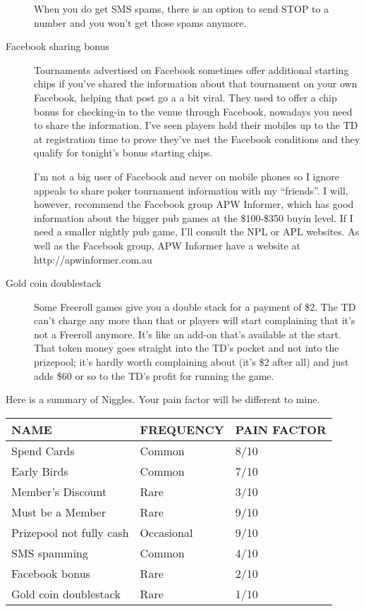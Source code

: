 \begin{description}
When you do get SMS spams, there is an option to send STOP to a number
and you won't get those spams anymore.

\item[Facebook sharing bonus] Tournaments advertised on Facebook sometimes
offer additional starting chips if you've shared the information
about that tournament on your own Facebook, helping that post go a
a bit viral. They used to offer a chip bonus for
checking-in to the venue through Facebook, nowadays you need to share
the information. I've seen players hold their mobiles up to the TD at
registration time to prove they've met the Facebook conditions and
they qualify for tonight's bonus starting chips.

I'm not a big user of Facebook and never on mobile phones so I ignore
appeals to share poker tournament information with my ``friends''. I
will, however, recommend the Facebook group APW Informer, which has
good information about the bigger pub games at the \$100-\$350 buyin
level. If I need a smaller nightly pub game, I'll consult the NPL or
APL websites. As well as the Facebook group, APW Informer have a
website at http://apwinformer.com.au

\item[Gold coin doublestack] Some Freeroll games give you a double stack
for a payment of \$2. The TD can't charge any more than that or
players will start complaining that it's not a Freeroll anymore.
It's like an add-on that's available at the start. That token
money goes straight into the TD's pocket and not into the prizepool;
it's hardly worth complaining about (it's \$2 after all) and just adds
\$60 or so to the TD's profit for running the game.

\end{description}

Here is a summary of Niggles. Your pain factor will be different to
mine.

\begin{tabular}{|l|l|l|} \hline
NAME    &  FREQUENCY  & PAIN FACTOR\\ \hline
Spend Cards & Common  & 8/10\\ \hline
Early Birds & Common & 7/10\\ \hline
Member's Discount & Rare  & 3/10\\ \hline
Must be a Member & Rare  & 9/10\\ \hline
Prizepool not fully cash & Occasional & 9/10\\ \hline
SMS spamming & Common & 4/10\\ \hline
Facebook bonus & Rare & 2/10 \\ \hline
Gold coin doublestack & Rare & 1/10 \\ \hline
\end{tabular}

